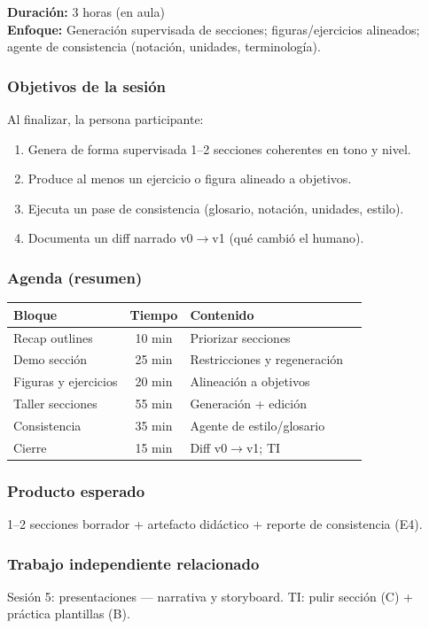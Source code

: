 \textbf{Duración:} 3 horas (en aula)\\
\textbf{Enfoque:} Generación supervisada de secciones; figuras/ejercicios alineados; agente de consistencia (notación, unidades, terminología).

\subsubsection*{Objetivos de la sesión}
Al finalizar, la persona participante:
\begin{enumerate}
\item Genera de forma supervisada 1--2 secciones coherentes en tono y nivel.
\item Produce al menos un ejercicio o figura alineado a objetivos.
\item Ejecuta un pase de consistencia (glosario, notación, unidades, estilo).
\item Documenta un diff narrado v0$\rightarrow$v1 (qué cambió el humano).
\end{enumerate}

\subsubsection*{Agenda (resumen)}
\begin{tabularx}{\textwidth}{@{}lclX@{}}
\toprule
Bloque & Tiempo & Contenido \\
\midrule
Recap outlines & 10 min & Priorizar secciones \\
Demo sección & 25 min & Restricciones y regeneración \\
Figuras y ejercicios & 20 min & Alineación a objetivos \\
Taller secciones & 55 min & Generación + edición \\
Consistencia & 35 min & Agente de estilo/glosario \\
Cierre & 15 min & Diff v0$\rightarrow$v1; TI \\
\bottomrule
\end{tabularx}

\subsubsection*{Producto esperado}
1--2 secciones borrador + artefacto didáctico + reporte de consistencia (E4).

\subsubsection*{Trabajo independiente relacionado}
Sesión 5: presentaciones --- narrativa y storyboard. TI: pulir sección (C) + práctica plantillas (B).
